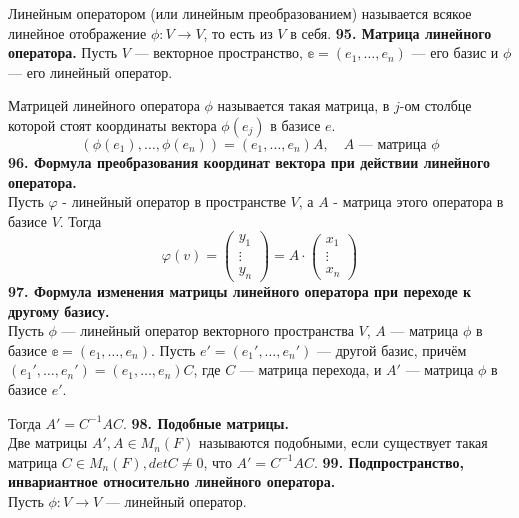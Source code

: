 \documentclass{article}
\begin{document}
Линейным оператором (или линейным преобразованием) называется всякое линейное отображение $\phi \colon V \rightarrow V$, то есть из $V$ в себя.
\newline
\newline
\textbf{95. Матрица линейного оператора.}
Пусть $V$ --- векторное пространство, $\mathbb{e} = (e_1, \ldots, e_n)$ --- его базис и $\phi$ --- его линейный оператор.

Матрицей линейного оператора $\phi$ называется такая матрица, в $j$-ом столбце которой стоят координаты вектора $\phi(e_j)$ в базисе $e$.
$$
\left(\phi(e_1), \ldots, \phi(e_n)\right) = \left(e_1, \ldots, e_n\right)A, \quad A \text{ --- матрица $\phi$}
$$
\textbf{96. Формула преобразования координат вектора при действии линейного оператора.} \\
   Пусть $\varphi$ - линейный оператор в пространстве $V$, а $A$ - матрица этого оператора в базисе $V$. Тогда
   $$
       \varphi(v) =
       \begin{pmatrix}
           y_1 \\ \vdots \\ y_n
       \end{pmatrix} =
       A \cdot \begin{pmatrix}
           x_1 \\ \vdots \\ x_n
       \end{pmatrix}
   $$
\newline
\newline
\textbf{97. Формула изменения матрицы линейного оператора при переходе к другому базису.}\\
Пусть $\phi$ --- линейный оператор векторного пространства $V$, $A$ --- матрица $\phi$ в базисе $\mathbb{e} = (e_1, \ldots, e_n)$. Пусть $e' = (e_1', \ldots, e_n')$ --- другой базис, причём $(e_1', \ldots, e_n') = (e_1, \ldots, e_n)C$, где $C$ --- матрица перехода, и $A'$ --- матрица $\phi$ в базисе $e'$.

Тогда $A' = C^{-1}AC$.
\newline
\newline
\textbf{98. Подобные матрицы.}\\
Две матрицы $A', A \in M_n(F)$ называются подобными, если существует такая матрица $C \in M_n(F), det C \neq 0$, что $A' = C^{-1}AC$.
\newline
\newline
\textbf{99. Подпространство, инвариантное относительно линейного оператора.}\\
Пусть $\phi\colon V \rightarrow V$ --- линейный оператор.
\end{document}
